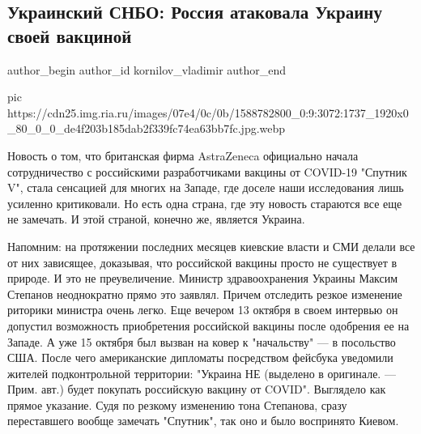  
 
 
 
 
 
\subsection{Украинский СНБО: Россия атаковала Украину своей вакциной}
\label{sec:14_12_2020.news.ru.ria.kornilov_vladimir.1.ukraina_snbo_vaccine_russia}
\ifcmt
	author_begin
   author_id kornilov_vladimir
	author_end
\fi

\ifcmt
pic https://cdn25.img.ria.ru/images/07e4/0c/0b/1588782800_0:9:3072:1737_1920x0_80_0_0_de4f203b185dab2f339fc74ea63bb7fc.jpg.webp
\fi

Новость о том, что британская фирма AstraZeneca официально начала
сотрудничество с российскими разработчиками вакцины от COVID-19 "Спутник V",
стала сенсацией для многих на Западе, где доселе наши исследования лишь
усиленно критиковали. Но есть одна страна, где эту новость стараются все еще не
замечать. И этой страной, конечно же, является Украина.

Напомним: на протяжении последних месяцев киевские власти и СМИ делали все от
них зависящее, доказывая, что российской вакцины просто не существует в
природе. И это не преувеличение. Министр здравоохранения Украины Максим
Степанов неоднократно прямо это заявлял. Причем отследить резкое изменение
риторики министра очень легко. Еще вечером 13 октября в своем интервью он
допустил возможность приобретения российской вакцины после одобрения ее на
Западе. А уже 15 октября был вызван на ковер к "начальству" — в посольство США.
После чего американские дипломаты посредством фейсбука уведомили жителей
подконтрольной территории: "Украина НЕ (выделено в оригинале. — Прим. авт.)
будет покупать российскую вакцину от COVID". Выглядело как прямое указание.
Судя по резкому изменению тона Степанова, сразу переставшего вообще замечать
"Спутник", так оно и было воспринято Киевом.

